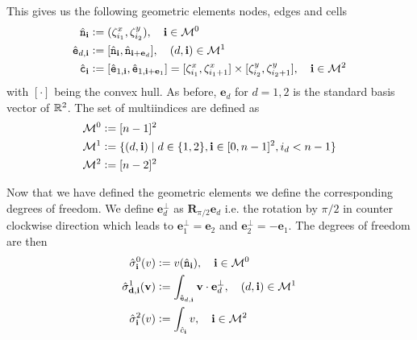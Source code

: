 \documentclass[../master_thesis.tex]{subfiles}
\begin{document}
This gives us the following geometric elements nodes, edges and cells
\begin{align*}
    \hat{\mathtt{n}}_\mathbf{i} &\vcentcolon= (\zeta^x_{i_1}, \zeta^y_{i_2}), \quad \mathbf{i} \in \mathcal{M}^0
    \\ \hat{\mathtt{e}}_{d,\mathbf{i}} 
        &\vcentcolon= [\hat{\mathtt{n}}_\mathbf{i}, \hat{\mathtt{n}}_{\mathbf{i} + \mathbf{e}_d}] 
        , \quad (d, \mathbf{i}) \in \mathcal{M}^1
    \\ \hat{\mathtt{c}}_\mathbf{i} &\vcentcolon= [\hat{\mathtt{e}}_{1,\mathbf{i}}, \hat{\mathtt{e}}_{1,\mathbf{i} + \mathbf{e}_1}]
        = [\zeta^x_{i_1}, \zeta^x_{i_1+1}] \times [\zeta^y_{i_2}, \zeta^y_{i_2+1}] 
        , \quad \mathbf{i} \in \mathcal{M}^2 
\end{align*}
with $[\cdot]$ being the convex hull. As before, $\mathbf{e}_d$ for $d = 1,2$ is the 
standard basis vector of $\mathbb{R}^2$. 
The set of multiindices are defined as
\begin{align*}
    \mathcal{M}^0 &\vcentcolon= [n-1]^2
    \\ \mathcal{M}^1 &\vcentcolon= \{ (d, \mathbf{i}) \mid d \in \{1,2\}, \mathbf{i} \in [0,n-1]^2, i_d < n-1 \}
    \\ \mathcal{M}^2 &\vcentcolon= [n-2]^2
\end{align*}

Now that we have defined the geometric elements we define the corresponding 
degrees of freedom. 
We define $\mathbf{e}_d^\perp$ as $\mathbf{R}_{\pi/2}\mathbf{e}_d$ i.e. the rotation by $\pi /2$ in counter clockwise 
direction which leads to $\mathbf{e}^\perp_1= \mathbf{e}_2$ and $\mathbf{e}^\perp_2= -\mathbf{e}_1$. 
The degrees of freedom are then
\begin{align*}
    \hat{\sigma}_\mathbf{i}^0(v)  &\vcentcolon= v(\hat{\mathtt{n}}_\mathbf{i}), \quad \mathbf{i} \in \mathcal{M}^0
    \\ \hat{\sigma}^1_{\mathbf{d,i}}(\mathbf{v})  
        &\vcentcolon= \int_{\hat{\mathtt{e}}_{d,\mathbf{i}}} \mathbf{v} \cdot \mathbf{e}^\perp_d 
        , \quad (d, \mathbf{i}) \in \mathcal{M}^1
    \\ \hat{\sigma}_{\mathbf{i}}^2(v) 
        &\vcentcolon= \int_{\hat{c}_{\mathbf{i}}} v 
        , \quad \mathbf{i} \in \mathcal{M}^2
\end{align*}
\end{document}
